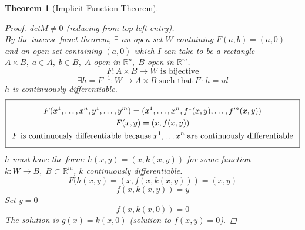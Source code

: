 \documentclass[12pt]{article}
\def\RR{\mathbb{R}}
\newtheorem{theorem}{Theorem}[section]
\begin{document}
\begin{theorem}[Implicit Function Theorem]
\begin{proof}
det$M \neq 0$ (reducing from top left entry).\\
By the inverse funct theorem, $\exists$ an open set $W$ containing $F(a,b) = (a,0)$ and an open set containing $(a,0)$ which I can take to be a rectangle $A \times B, \;  a \in A , \; b \in B, \; A$ open in $\RR^n, \; B$ open in $\RR^m$.\\
\[F:A \times B \rightarrow W \text{ is bijective}\]
\[\exists h = F^{-1}:W \rightarrow A \times B \; \text{such that} \; F \cdot h = id\]
$h$ is continuously differentiable.
\begin{equation*} 
  \addtolength{\fboxsep}{5pt} 
   \boxed{ 
   \begin{gathered} 
      F(x^1,\dots , x^n,y^1, \dots,y^m) = (x^1, \dots , x^n, f^1(x,y), \dots , f^m(x,y))  \\ 
      F(x,y) = (x,f(x,y)) 
      \\ F \;\text{is continuously differentiable because} \; x^1 , \dots x^n \; \text{are continuously differentiable}
   \end{gathered} 
   } 
\end{equation*}
$h$ must have the form: $h(x,y) =  (x,k(x,y))$ for some function $k:W \rightarrow B, \; B \subset \RR^m$, $k$ continuously differentiable.
\[F(h(x,y) = (x,f(x,k(x,y))) = (x,y)\]
\[f(x,k(x,y)) = y\]
Set $y=0$
\[f(x,k(x,0))=0\]
The solution is $g(x)=k(x,0)$ (solution to $f(x,y)= 0$).
\end{proof}
\end{theorem}
\end{document}
